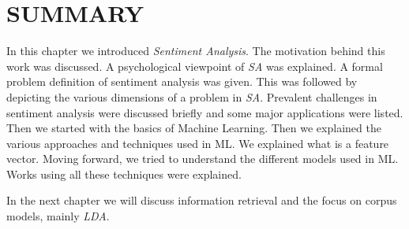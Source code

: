 \section*{SUMMARY}

In this chapter we introduced \textit{Sentiment Analysis}. The motivation behind this work was discussed. A psychological viewpoint of 
\textit{SA} was explained. A formal problem definition of sentiment analysis was given. This was followed by depicting the various 
dimensions of a problem in \textit{SA}. Prevalent challenges in sentiment analysis were discussed briefly and some major applications were
listed. Then we started with the basics of Machine Learning. Then we explained the various approaches and techniques used
in ML. We explained what is a feature vector. Moving forward, we tried to understand the different models used in ML. Works using
all these techniques were explained.

In the next chapter we will discuss information retrieval and the focus on corpus models, mainly \textit{LDA}.

\clearpage